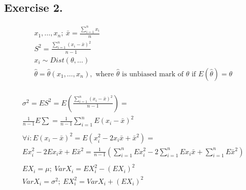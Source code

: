 \documentclass{article}
\begin{document}
\subsection*{Exercise 2.}

\begin{fleqn}
  \begin{gather*}
    x_1,\dots,x_n;\ \bar{x} = \frac{\sum_{i=1}^n{x_i}}{n} \\ 
    S^2 = \frac{\sum_{i = 1}^n(x_i - \bar{x})^2}{n - 1} \\ 
    x_i \sim Dist(\theta, \dots) \\ 
    \hat{\theta} = \hat{\theta}(x_1, \dots, x_n), \text{ where } \hat{\theta} \text{ is unbiased mark of } \theta \text{ if } E(\hat{\theta}) = \theta \\ 
  \end{gather*}
\end{fleqn}

\begin{fleqn}
  \begin{gather*}
    \sigma^2 =ES^2 = E(\frac{\sum_{i = 1}^n{(x_i - \bar{x})^2}}{n - 1}) = \\ 
    \frac{1}{n-1}E\sum = \frac{1}{n-1}\sum_{i=1}^n{E(x_i-\bar{x})^2} \\ \\ 
    \forall i: E(x_i - \bar{x})^2 = E(x_i^2 - 2x_i\bar{x}+\bar{x}^2) = \\ 
    Ex_i^2 - 2Ex_i\bar{x} + E\bar{x}^2 = \frac{1}{n -
    1}(\sum_{i=1}^n{Ex_i^2}-2\sum_{i=1}^n{Ex_i\bar{x}}+\sum_{i=1}^n{E\bar{x}^2}) \\ \\
    EX_i = \mu;\ VarX_i = EX_i^2 - (EX_i)^2 \\
    VarX_i = \sigma^2;\ EX_i^2 = VarX_i + (EX_i)^2 \\
  \end{gather*}
\end{fleqn}
\end{document}
